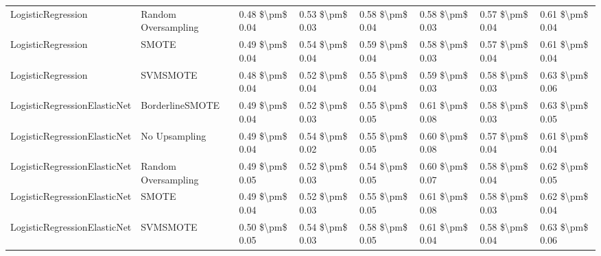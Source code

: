 \begin{tabular}{llllllll}
             LogisticRegression &           Random Oversampling & 0.48 \$\textbackslash pm\$ 0.04 &           0.53 \$\textbackslash pm\$ 0.03 &       0.58 \$\textbackslash pm\$ 0.04 &        0.58 \$\textbackslash pm\$ 0.03 &                         0.57 \$\textbackslash pm\$ 0.04 &     0.61 \$\textbackslash pm\$ 0.04 \\
             LogisticRegression &                         SMOTE & 0.49 \$\textbackslash pm\$ 0.04 &           0.54 \$\textbackslash pm\$ 0.04 &       0.59 \$\textbackslash pm\$ 0.04 &        0.58 \$\textbackslash pm\$ 0.03 &                         0.57 \$\textbackslash pm\$ 0.04 &     0.61 \$\textbackslash pm\$ 0.04 \\
             LogisticRegression &                      SVMSMOTE & 0.48 \$\textbackslash pm\$ 0.04 &           0.52 \$\textbackslash pm\$ 0.04 &       0.55 \$\textbackslash pm\$ 0.04 &        0.59 \$\textbackslash pm\$ 0.03 &                         0.58 \$\textbackslash pm\$ 0.03 &     0.63 \$\textbackslash pm\$ 0.06 \\
   LogisticRegressionElasticNet &               BorderlineSMOTE & 0.49 \$\textbackslash pm\$ 0.04 &           0.52 \$\textbackslash pm\$ 0.03 &       0.55 \$\textbackslash pm\$ 0.05 &        0.61 \$\textbackslash pm\$ 0.08 &                         0.58 \$\textbackslash pm\$ 0.03 &     0.63 \$\textbackslash pm\$ 0.05 \\
   LogisticRegressionElasticNet &                 No Upsampling & 0.49 \$\textbackslash pm\$ 0.04 &           0.54 \$\textbackslash pm\$ 0.02 &       0.55 \$\textbackslash pm\$ 0.05 &        0.60 \$\textbackslash pm\$ 0.08 &                         0.57 \$\textbackslash pm\$ 0.04 &     0.61 \$\textbackslash pm\$ 0.04 \\
   LogisticRegressionElasticNet &           Random Oversampling & 0.49 \$\textbackslash pm\$ 0.05 &           0.52 \$\textbackslash pm\$ 0.03 &       0.54 \$\textbackslash pm\$ 0.05 &        0.60 \$\textbackslash pm\$ 0.07 &                         0.58 \$\textbackslash pm\$ 0.04 &     0.62 \$\textbackslash pm\$ 0.05 \\
   LogisticRegressionElasticNet &                         SMOTE & 0.49 \$\textbackslash pm\$ 0.04 &           0.52 \$\textbackslash pm\$ 0.03 &       0.55 \$\textbackslash pm\$ 0.05 &        0.61 \$\textbackslash pm\$ 0.08 &                         0.58 \$\textbackslash pm\$ 0.03 &     0.62 \$\textbackslash pm\$ 0.04 \\
   LogisticRegressionElasticNet &                      SVMSMOTE & 0.50 \$\textbackslash pm\$ 0.05 &           0.54 \$\textbackslash pm\$ 0.03 &       0.58 \$\textbackslash pm\$ 0.05 &        0.61 \$\textbackslash pm\$ 0.04 &                         0.58 \$\textbackslash pm\$ 0.04 &     0.63 \$\textbackslash pm\$ 0.06 \\

\end{tabular}
